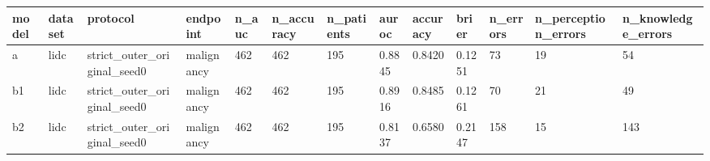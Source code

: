 \begin{tabular}{lllllllllllll}
\hline
model & dataset & protocol & endpoint & n\_auc & n\_accuracy & n\_patients & auroc & accuracy & brier & n\_errors & n\_perception\_errors & n\_knowledge\_errors \\
\hline
a & lidc & strict\_outer\_original\_seed0 & malignancy & 462 & 462 & 195 & 0.8845 & 0.8420 & 0.1251 & 73 & 19 & 54 \\
b1 & lidc & strict\_outer\_original\_seed0 & malignancy & 462 & 462 & 195 & 0.8916 & 0.8485 & 0.1261 & 70 & 21 & 49 \\
b2 & lidc & strict\_outer\_original\_seed0 & malignancy & 462 & 462 & 195 & 0.8137 & 0.6580 & 0.2147 & 158 & 15 & 143 \\
\hline
\end{tabular}
